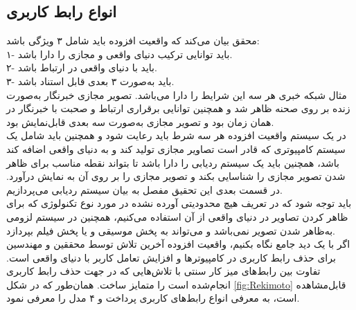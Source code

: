 \subsection{انواع رابط کاربری}
\noindent
محقق  بیان می‌کند که واقعیت افزوده باید شامل ۳ ویژگی باشد\cite{Azuma}:
\\
۱- باید توانایی ترکیب دنیای واقعی و مجازی را دارا باشد.
\\
۲- باید با دنیای واقعی در ارتباط باشد.
\\
۳- باید به‌صورت ۳ بعدی قابل استناد باشد.
\\
مثال شبکه خبری  هر سه این شرایط را دارا می‌باشد. تصویر مجازی خبرنگار  به‌صورت زنده بر روی صحنه ظاهر شد و همچنین توانایی برقراری ارتباط و صحبت با خبرنگار  در همان زمان بود و تصویر مجازی به‌صورت سه بعدی قابل‌نمایش بود.
\\
در یک سیستم واقعیت افزوده هر سه شرط باید رعایت شود و همچنین باید شامل یک سیستم کامپیوتری که قادر است تصاویر مجازی تولید کند و به دنیای واقعی اضافه کند باشد، همچنین باید یک سیستم ردیابی  را دارا باشد تا بتواند نقطه مناسب برای ظاهر شدن تصویر مجازی را شناسایی بکند و تصویر مجازی را بر روی آن به نمایش درآورد. در قسمت بعدی این تحقیق مفصل به بیان سیستم ردیابی می‌پردازیم.
\\
باید توجه شود که در تعریف  هیچ محدودیتی آورده نشده در مورد نوع تکنولوژی که برای ظاهر کردن تصاویر در دنیای واقعی از آن استفاده می‌کنیم، همچنین در سیستم لزومی به‌ظاهر شدن تصویر نمی‌باشد و می‌تواند به پخش موسیقی و یا پخش فیلم بپردازد.
\\
اگر با یک دید جامع نگاه بکنیم، واقعیت افزوده آخرین تلاش توسط محققین و مهندسین برای حذف رابط کاربری در کامپیوترها و افزایش تعامل کاربر با دنیای واقعی است.  تفاوت بین رابط‌های میز کار سنتی  با تلاش‌هایی که در جهت حذف رابط کاربری انجام‌شده است را متمایز ساخت\cite{Rekimoto}. همان‌طور که در شکل \ref{fig:Rekimoto} قابل‌مشاهده است،  به معرفی انواع رابط‌های کاربری پرداخت و ۴ مدل را معرفی نمود.
\\
